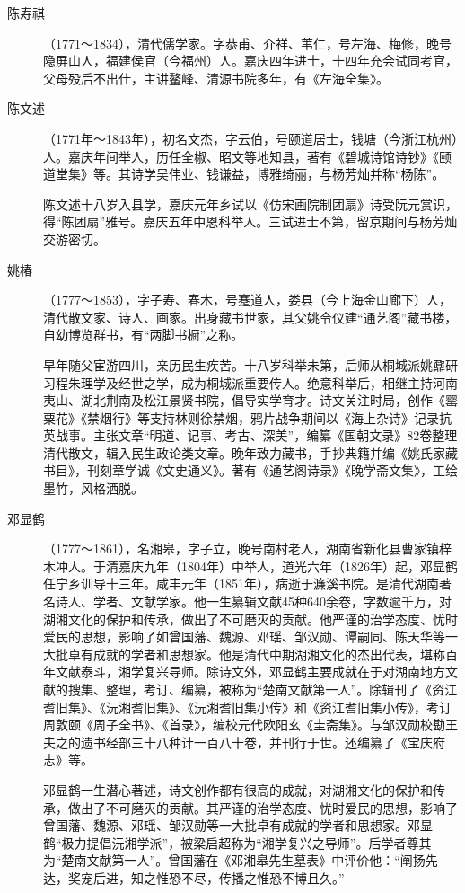 \begin{description}
  \item[陈寿祺] （1771～1834），清代儒学家。字恭甫、介祥、苇仁，号左海、梅修，晚号隐屏山人，福建侯官（今福州）人。嘉庆四年进士，十四年充会试同考官，父母殁后不出仕，主讲鳌峰、清源书院多年，有《左海全集》。
  \item[陈文述] （1771年～1843年），初名文杰，字云伯，号颐道居士，钱塘（今浙江杭州）人。嘉庆年间举人，历任全椒、昭文等地知县，著有《碧城诗馆诗钞》《颐道堂集》等。其诗学吴伟业、钱谦益，博雅绮丽，与杨芳灿并称“杨陈”。\par
        陈文述十八岁入县学，嘉庆元年乡试以《仿宋画院制团扇》诗受阮元赏识，得“陈团扇”雅号。嘉庆五年中恩科举人。三试进士不第，留京期间与杨芳灿交游密切。
  \item[姚椿] （1777～1853），字子寿、春木，号蹇道人，娄县（今上海金山廊下）人，清代散文家、诗人、画家。出身藏书世家，其父姚令仪建“通艺阁”藏书楼，自幼博览群书，有“两脚书橱”之称。\par
        早年随父宦游四川，亲历民生疾苦。十八岁科举未第，后师从桐城派姚鼐研习程朱理学及经世之学，成为桐城派重要传人。绝意科举后，相继主持河南夷山、湖北荆南及松江景贤书院，倡导实学育才。诗文关注时局，创作《罂粟花》《禁烟行》等支持林则徐禁烟，鸦片战争期间以《海上杂诗》记录抗英战事。主张文章“明道、记事、考古、深美”，编纂《国朝文录》82卷整理清代散文，辑入民生政论类文章。晚年致力藏书，手抄典籍并编《姚氏家藏书目》，刊刻章学诚《文史通义》。著有《通艺阁诗录》《晚学斋文集》，工绘墨竹，风格洒脱。
  \item[邓显鹤] （1777～1861），名湘皋，字子立，晚号南村老人，湖南省新化县曹家镇梓木冲人。于清嘉庆九年（1804年）中举人，道光六年（1826年）起，邓显鹤任宁乡训导十三年。咸丰元年（1851年），病逝于濂溪书院。是清代湖南著名诗人、学者、文献学家。他一生纂辑文献45种640余卷，字数逾千万，对湖湘文化的保护和传承，做出了不可磨灭的贡献。他严谨的治学态度、忧时爱民的思想，影响了如曾国藩、魏源、邓瑶、邹汉勋、谭嗣同、陈天华等一大批卓有成就的学者和思想家。他是清代中期湖湘文化的杰出代表，堪称百年文献泰斗，湘学复兴导师。除诗文外，邓显鹤主要成就在于对湖南地方文献的搜集、整理，考订、编纂，被称为“楚南文献第一人”。除辑刊了《资江耆旧集》、《沅湘耆旧集》、《沅湘耆旧集小传》和《资江耆旧集小传》，考订周敦颐《周子全书》、《首录》，编校元代欧阳玄《圭斋集》。与邹汉勋校勘王夫之的遗书经部三十八种计一百八十卷，并刊行于世。还编纂了《宝庆府志》等。\par
        邓显鹤一生潜心著述，诗文创作都有很高的成就，对湖湘文化的保护和传承，做出了不可磨灭的贡献。其严谨的治学态度、忧时爱民的思想，影响了曾国藩、魏源、邓瑶、邹汉勋等一大批卓有成就的学者和思想家。邓显鹤“极力提倡沅湘学派”，被梁启超称为“湘学复兴之导师”。后学者尊其为“楚南文献第一人”。曾国藩在《邓湘皋先生墓表》中评价他：“阐扬先达，奖宠后进，知之惟恐不尽，传播之惟恐不博且久。”

\end{description}
